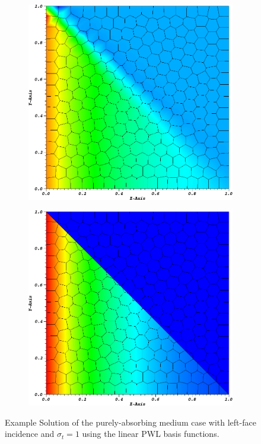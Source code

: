\begin{figure}
{\begin{subfigure}[b]{0.485\textwidth}
	\end{subfigure}
}
\vspace{1cm}
{
	\begin{subfigure}[b]{0.485\textwidth}
		\centering
		\label{subfig::PA_Mesh_Poly}
		\includegraphics[width=\textwidth]{figures/sec_BF/PALeftSol_Poly.png}
	\end{subfigure}
	\hfill
	\begin{subfigure}[b]{0.485\textwidth}
		\centering
		\label{subfig::PA_Mesh_SplitPoly}
		\includegraphics[width=\textwidth]{figures/sec_BF/PALeftSol_SplitPoly.png}
	\end{subfigure}
}
\caption{Example Solution of the purely-absorbing medium case with left-face incidence and $\sigma_t=1$ using the linear PWL basis functions.}
\label{fig::BF_Results_PA_Left_Solutions}
\end{figure}

